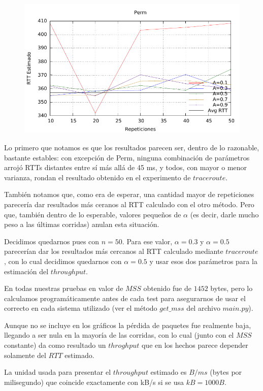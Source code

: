 \begin{figure}[htp]
 \centering
 \includegraphics[scale=0.80]{imgs/thoughput/psu_rtt.pdf}
\end{figure}

Lo primero que notamos es que los resultados parecen ser, dentro de lo razonable, bastante estables: con excepción de Perm, ninguna combinación de parámetros arrojó RTTs distantes entre sí más allá de 45 ms, y todos, con mayor o menor varianza, rondan el resultado obtenido en el experimento de $traceroute$.

También notamos que, como era de esperar, una cantidad mayor de repeticiones parecería dar resultados más ceranos al RTT calculado con el otro método. Pero que, también dentro de lo esperable, valores pequeños de $\alpha$ (es decir, darle mucho peso a las últimas corridas) anulan esta situación.

Decidimos quedarnos pues con $n=50$. Para ese valor, $\alpha = 0.3$ y $\alpha = 0.5$ parecerían dar los resultados más cercanos al RTT calculado mediante $traceroute$, con lo cual decidimos quedarnos con $\alpha = 0.5$ y usar esos dos parámetros para la estimación del $throughput$.

En todas nuestras pruebas en valor de $MSS$ obtenido fue de $1452$ bytes, pero lo calculamos programáticamente antes de cada test para asegurarnos de usar el correcto en cada sistema utilizado (ver el método $get\_mss$ del archivo $main.py$).

Aunque no se incluye en los gráficos la pérdida de paquetes fue realmente baja, llegando a ser nula en la mayoría de las corridas, con lo cual (junto con el $MSS$ constante) da como resultado un $throghput$ que en los hechos parece depender solamente del $RTT$ estimado.

La unidad usada para presentar el $throughput$ estimado es $B/ms$ (bytes por milisegundo) que coincide exactamente con kB/s si se usa $kB = 1000B$.

